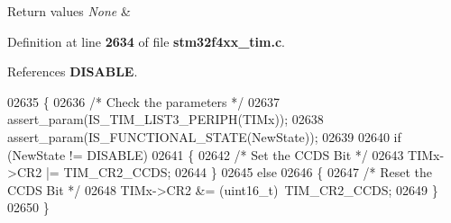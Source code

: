\begin{DoxyRetVals}{Return values}
{\em None} & \\
\hline
\end{DoxyRetVals}


Definition at line \textbf{ 2634} of file \textbf{ stm32f4xx\+\_\+tim.\+c}.



References \textbf{ D\+I\+S\+A\+B\+LE}.


\begin{DoxyCode}
02635 \{
02636   \textcolor{comment}{/* Check the parameters */}
02637   assert_param(IS_TIM_LIST3_PERIPH(TIMx));
02638   assert_param(IS_FUNCTIONAL_STATE(NewState));
02639 
02640   \textcolor{keywordflow}{if} (NewState != DISABLE)
02641   \{
02642     \textcolor{comment}{/* Set the CCDS Bit */}
02643     TIMx->CR2 |= TIM_CR2_CCDS;
02644   \}
02645   \textcolor{keywordflow}{else}
02646   \{
02647     \textcolor{comment}{/* Reset the CCDS Bit */}
02648     TIMx->CR2 &= (uint16\_t)~TIM_CR2_CCDS;
02649   \}
02650 \}
\end{DoxyCode}
